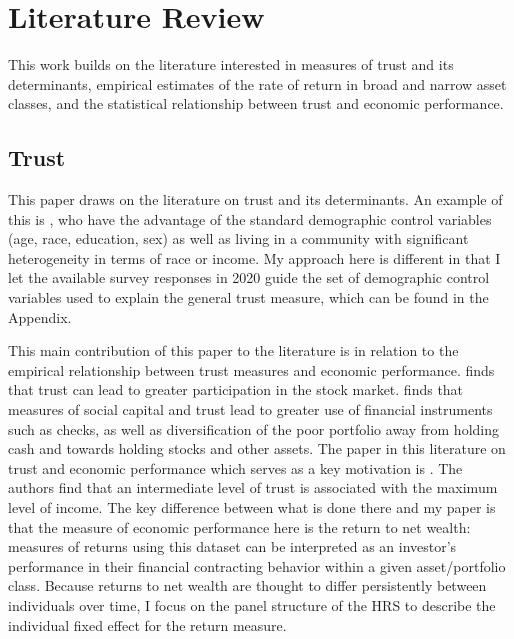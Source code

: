 \onlyinsubfile{\setcounter{section}{1}}
\section{Literature Review}
\label{sec:litrev}


\par This work builds on the literature interested in measures of trust and its determinants, empirical estimates of the rate of return in broad and narrow asset classes, and the statistical relationship between trust and economic performance. 

\subsection{Trust}

\par This paper draws on the literature on trust and its determinants. An example of this is \cite{Alesina2000}, who have the advantage of the standard demographic control variables (age, race, education, sex) as well as living in a community with significant heterogeneity in terms of race or income. My approach here is different in that I let the available survey responses in 2020 guide the set of demographic control variables used to explain the general trust measure, which can be found in the Appendix.  


\par This main contribution of this paper to the literature is in relation to the empirical relationship between trust measures and economic performance.  \cite{lgpslz2008} finds that trust can lead to greater participation in the stock market. \cite{Guiso2004} finds that measures of social capital and trust lead to greater use of financial instruments such as checks, as well as diversification of the poor portfolio away from holding cash and towards holding stocks and other assets. The paper in this literature on trust and economic performance which serves as a key motivation is \cite{jbpglg2016}. The authors find that an intermediate level of trust is associated with the maximum level of income. The key difference between what is done there and my paper is that the measure of economic performance here is the return to net wealth: measures of returns using this dataset can be interpreted as an investor's performance in their financial contracting behavior within a given asset/portfolio class. Because returns to net wealth are thought to differ persistently between individuals over time, I focus on the panel structure of the HRS to describe the individual fixed effect for the return measure. 

